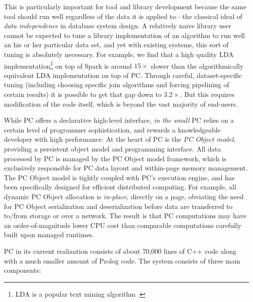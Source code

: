This is particularly important for tool and library development because the same tool should run well regardless of the data
it is applied to---the classical ideal of \emph{data independence} in database system design.
A relatively naive library user cannot be expected to tune a library implementation of an algorithm to run
well an his or her particular data set, and yet with existing systems, this sort of tuning
is absolutely necessary.  For example, we find
that a high quality LDA implementation\footnote{LDA is a popular text mining algorithm \cite{}.}
on top of Spark is around $15\times$ slower than the algorithmically equivalent LDA
implementation on top of PC.  Through careful, dataset-specific tuning (including choosing specific join algorithms and
forcing pipelining of certain results) it is possible to get that gap down to $3.2\times$.  But this requires modification of the
code itself, which is beyond the vast majority of end-users.

While PC offers a declarative high-level interface, 
\emph{in the small} PC relies on a certain level of programmer sophistication, 
and rewards a knowledgeable developer with high performance.
At the heart of PC is the \emph{PC Object model}, 
providing a persistent object model and programming interface.  All data processed by PC is managed by
the PC Object
model framework, which is exclusively responsible for PC data layout and within-page memory management.  
The PC Object model is tightly coupled with
PC's execution engine, and has been specifically designed for efficient distributed computing.  
For example, all dynamic PC Object allocation is \emph{in-place}, directly on a page, obviating
the need for PC Object serialization and deserialization before data are transferred to to/from storage or over a network.
The result is that PC computations may have an order-of-magnitude lower CPU cost than comparable computations carefully built upon 
managed runtimes.

PC in its current realization consists of about 70,000 lines of C++ code along with a much smaller amount of Prolog code.
The system consists of three main components: 

